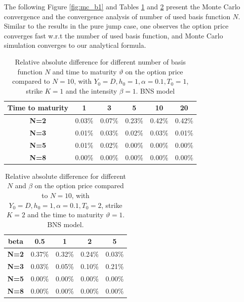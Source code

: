 \documentclass[10pt,a4paper,reqno]{amsart}
\numberwithin{equation}{section}
\theoremstyle{plain}
\theoremstyle{definition}
\theoremstyle{example}
\begin{document}
The following Figure \ref{fig:mc_b1} and Tables \ref{tab:n_theta_b1} and \ref{tab:n_beta_b1} present the Monte Carlo convergence and the convergence analysis of number of used basis function $N$. Similar to the results in the pure jump case, one observes the option price converges fast w.r.t the number of used basis function, and Monte Carlo simulation converges to our analytical formula.
\begin{table}[h]
    \centering
    \begin{tabular}{|c|ccccc|}
        \hline
        \textbf{Time to maturity} & \textbf{1} & \textbf{3} & \textbf{5} & \textbf{10} & \textbf{20} \\
        \hline
        \textbf{N=2} & 0.03\% & 0.07\% & 0.23\% & 0.42\% & 0.42\% \\
        \textbf{N=3} & 0.01\% & 0.03\% & 0.02\% & 0.03\% & 0.01\% \\
        \textbf{N=5} & 0.01\% & 0.02\% & 0.00\% & 0.00\% & 0.00\% \\
        \textbf{N=8} & 0.00\% & 0.00\% & 0.00\% & 0.00\% & 0.00\% \\
        \hline
    \end{tabular}
    \vspace{2mm}
    \caption{Relative absolute difference for different number of basis function $N$ and time to maturity $\vartheta$ on the option price compared to $N=10$, with $Y_0=D, h_0=1, \alpha=0.1, T_0=1$, strike $K=1$ and the intensity $\beta=1$. BNS model}
    \label{tab:n_theta_b1}
\end{table}

\begin{table}[h]
    \centering
    \begin{tabular}{|c|cccc|}
    \hline
    \textbf{beta} & \textbf{0.5} & \textbf{1} & \textbf{2} & \textbf{5} \\
        \hline
        \textbf{N=2} & 0.37\% & 0.32\% & 0.24\% & 0.03\% \\
        \textbf{N=3} & 0.03\% & 0.05\% & 0.10\% & 0.21\% \\
        \textbf{N=5} & 0.00\% & 0.00\% & 0.00\% & 0.00\% \\
        \textbf{N=8} & 0.00\% & 0.00\% & 0.00\% & 0.00\% \\
        \hline
    \end{tabular}
    \vspace{2mm}
    \caption{Relative absolute difference for different $N$ and $\beta$ on the option price compared to $N=10$, with $Y_0=D, h_0=1, \alpha=0.1, T_0=2$, strike $K=2$ and the time to maturity $\vartheta=1$. BNS model.}
    \label{tab:n_beta_b1}
\end{table}
\end{document}
